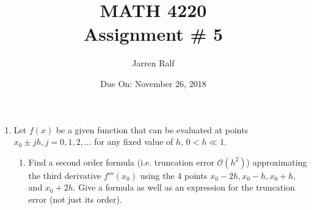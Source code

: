 \documentclass{article}
\title{MATH 4220 \\ Assignment \# 5}
\author{Jarren Ralf}
\date{Due On: November 26, 2018}
\begin{document}
	\maketitle
	
	\begin{enumerate}[label = \arabic*]
		\item Let $f(x)$ be a given function that can be evaluated at points $x_0 \pm jh, j = 0, 1, 2, \dots$ for any fixed value of $h$, $0 < h \ll 1.$
		\begin{enumerate}
			\item Find a second order formula (i.e. truncation error $\mathcal{O} \left( h^2 \right)$) approximating the third derivative $f'''(x_0)$ using the 4 points $x_0 - 2h, x_0 - h, x_0 + h,$ and $x_0 + 2h$. Give a formula as well as an expression for the truncation error (not just its order). \\
			

\end{enumerate}
\end{enumerate}
\end{document}
